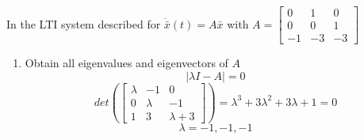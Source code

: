 \item In the LTI system described for $\dot {\bar x}(t) = A\bar x$ with
  $A = \begin{bmatrix}
0 & 1 & 0\\
0 & 0 & 1\\
-1 & -3 & -3
\end{bmatrix}
$
  \begin{enumerate}
  \item Obtain all eigenvalues and eigenvectors of $A$\label{1-a}\\
    \begin{equation}
  \vert \lambda I - A \vert = 0
\end{equation}
\begin{equation}
  det(\left[\begin{matrix}\lambda & -1 & 0\\0 & \lambda & -1\\1 & 3 & \lambda + 3\end{matrix}\right]) = \lambda^{3} + 3 \lambda^{2} + 3 \lambda + 1 = 0
\end{equation}
\begin{equation}
  \lambda = -1, -1, -1
\end{equation}


\end{enumerate}
